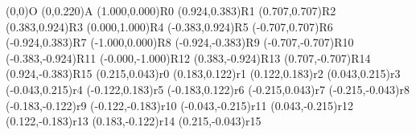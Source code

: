 \pstGeonode(0,0){O}
\pstGeonode(0,0.220){A}
\pstGeonode(1.000,0.000){R0}
\pstGeonode(0.924,0.383){R1}
\pstGeonode(0.707,0.707){R2}
\pstGeonode(0.383,0.924){R3}
\pstGeonode(0.000,1.000){R4}
\pstGeonode(-0.383,0.924){R5}
\pstGeonode(-0.707,0.707){R6}
\pstGeonode(-0.924,0.383){R7}
\pstGeonode(-1.000,0.000){R8}
\pstGeonode(-0.924,-0.383){R9}
\pstGeonode(-0.707,-0.707){R10}
\pstGeonode(-0.383,-0.924){R11}
\pstGeonode(-0.000,-1.000){R12}
\pstGeonode(0.383,-0.924){R13}
\pstGeonode(0.707,-0.707){R14}
\pstGeonode(0.924,-0.383){R15}
\pstGeonode(0.215,0.043){r0}
\pstGeonode(0.183,0.122){r1}
\pstGeonode(0.122,0.183){r2}
\pstGeonode(0.043,0.215){r3}
\pstGeonode(-0.043,0.215){r4}
\pstGeonode(-0.122,0.183){r5}
\pstGeonode(-0.183,0.122){r6}
\pstGeonode(-0.215,0.043){r7}
\pstGeonode(-0.215,-0.043){r8}
\pstGeonode(-0.183,-0.122){r9}
\pstGeonode(-0.122,-0.183){r10}
\pstGeonode(-0.043,-0.215){r11}
\pstGeonode(0.043,-0.215){r12}
\pstGeonode(0.122,-0.183){r13}
\pstGeonode(0.183,-0.122){r14}
\pstGeonode(0.215,-0.043){r15}
